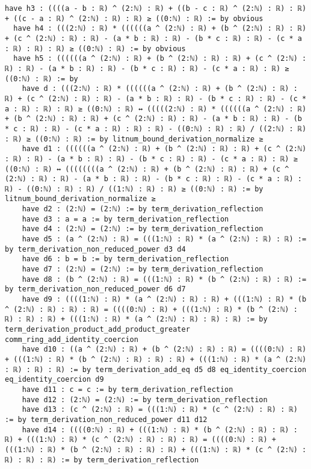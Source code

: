 \documentclass{article}
\begin{document}
\begin{tcolorbox}[colback=white!10, width=\linewidth]
\begin{lstlisting}[language=Lean4]
  have h3 : ((((a - b : ℝ) ^ (2:ℕ) : ℝ) + ((b - c : ℝ) ^ (2:ℕ) : ℝ) : ℝ) + ((c - a : ℝ) ^ (2:ℕ) : ℝ) : ℝ) ≥ ((0:ℕ) : ℝ) := by obvious
  have h4 : (((2:ℕ) : ℝ) * ((((((a ^ (2:ℕ) : ℝ) + (b ^ (2:ℕ) : ℝ) : ℝ) + (c ^ (2:ℕ) : ℝ) : ℝ) - (a * b : ℝ) : ℝ) - (b * c : ℝ) : ℝ) - (c * a : ℝ) : ℝ) : ℝ) ≥ ((0:ℕ) : ℝ) := by obvious
  have h5 : ((((((a ^ (2:ℕ) : ℝ) + (b ^ (2:ℕ) : ℝ) : ℝ) + (c ^ (2:ℕ) : ℝ) : ℝ) - (a * b : ℝ) : ℝ) - (b * c : ℝ) : ℝ) - (c * a : ℝ) : ℝ) ≥ ((0:ℕ) : ℝ) := by
    have d : (((2:ℕ) : ℝ) * ((((((a ^ (2:ℕ) : ℝ) + (b ^ (2:ℕ) : ℝ) : ℝ) + (c ^ (2:ℕ) : ℝ) : ℝ) - (a * b : ℝ) : ℝ) - (b * c : ℝ) : ℝ) - (c * a : ℝ) : ℝ) : ℝ) ≥ ((0:ℕ) : ℝ) ↔ (((((2:ℕ) : ℝ) * ((((((a ^ (2:ℕ) : ℝ) + (b ^ (2:ℕ) : ℝ) : ℝ) + (c ^ (2:ℕ) : ℝ) : ℝ) - (a * b : ℝ) : ℝ) - (b * c : ℝ) : ℝ) - (c * a : ℝ) : ℝ) : ℝ) - ((0:ℕ) : ℝ) : ℝ) / ((2:ℕ) : ℝ) : ℝ) ≥ ((0:ℕ) : ℝ) := by litnum_bound_derivation_normalize ≥
    have d1 : ((((((a ^ (2:ℕ) : ℝ) + (b ^ (2:ℕ) : ℝ) : ℝ) + (c ^ (2:ℕ) : ℝ) : ℝ) - (a * b : ℝ) : ℝ) - (b * c : ℝ) : ℝ) - (c * a : ℝ) : ℝ) ≥ ((0:ℕ) : ℝ) ↔ ((((((((a ^ (2:ℕ) : ℝ) + (b ^ (2:ℕ) : ℝ) : ℝ) + (c ^ (2:ℕ) : ℝ) : ℝ) - (a * b : ℝ) : ℝ) - (b * c : ℝ) : ℝ) - (c * a : ℝ) : ℝ) - ((0:ℕ) : ℝ) : ℝ) / ((1:ℕ) : ℝ) : ℝ) ≥ ((0:ℕ) : ℝ) := by litnum_bound_derivation_normalize ≥
    have d2 : (2:ℕ) = (2:ℕ) := by term_derivation_reflection
    have d3 : a = a := by term_derivation_reflection
    have d4 : (2:ℕ) = (2:ℕ) := by term_derivation_reflection
    have d5 : (a ^ (2:ℕ) : ℝ) = (((1:ℕ) : ℝ) * (a ^ (2:ℕ) : ℝ) : ℝ) := by term_derivation_non_reduced_power d3 d4
    have d6 : b = b := by term_derivation_reflection
    have d7 : (2:ℕ) = (2:ℕ) := by term_derivation_reflection
    have d8 : (b ^ (2:ℕ) : ℝ) = (((1:ℕ) : ℝ) * (b ^ (2:ℕ) : ℝ) : ℝ) := by term_derivation_non_reduced_power d6 d7
    have d9 : ((((1:ℕ) : ℝ) * (a ^ (2:ℕ) : ℝ) : ℝ) + (((1:ℕ) : ℝ) * (b ^ (2:ℕ) : ℝ) : ℝ) : ℝ) = ((((0:ℕ) : ℝ) + (((1:ℕ) : ℝ) * (b ^ (2:ℕ) : ℝ) : ℝ) : ℝ) + (((1:ℕ) : ℝ) * (a ^ (2:ℕ) : ℝ) : ℝ) : ℝ) := by term_derivation_product_add_product_greater comm_ring_add_identity_coercion
    have d10 : ((a ^ (2:ℕ) : ℝ) + (b ^ (2:ℕ) : ℝ) : ℝ) = ((((0:ℕ) : ℝ) + (((1:ℕ) : ℝ) * (b ^ (2:ℕ) : ℝ) : ℝ) : ℝ) + (((1:ℕ) : ℝ) * (a ^ (2:ℕ) : ℝ) : ℝ) : ℝ) := by term_derivation_add_eq d5 d8 eq_identity_coercion eq_identity_coercion d9
    have d11 : c = c := by term_derivation_reflection
    have d12 : (2:ℕ) = (2:ℕ) := by term_derivation_reflection
    have d13 : (c ^ (2:ℕ) : ℝ) = (((1:ℕ) : ℝ) * (c ^ (2:ℕ) : ℝ) : ℝ) := by term_derivation_non_reduced_power d11 d12
    have d14 : ((((0:ℕ) : ℝ) + (((1:ℕ) : ℝ) * (b ^ (2:ℕ) : ℝ) : ℝ) : ℝ) + (((1:ℕ) : ℝ) * (c ^ (2:ℕ) : ℝ) : ℝ) : ℝ) = ((((0:ℕ) : ℝ) + (((1:ℕ) : ℝ) * (b ^ (2:ℕ) : ℝ) : ℝ) : ℝ) + (((1:ℕ) : ℝ) * (c ^ (2:ℕ) : ℝ) : ℝ) : ℝ) := by term_derivation_reflection

\end{lstlisting}
\end{tcolorbox}
\end{document}
